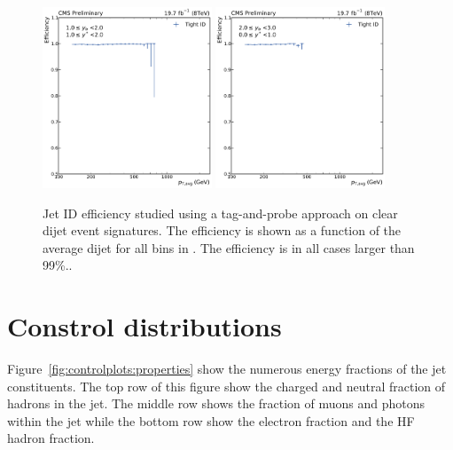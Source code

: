 \begin{figure}[htbp]
    \includegraphics[width=0.45\textwidth]{figures/measurement/jetideff_yb1ys1.pdf}\hfill
    \includegraphics[width=0.45\textwidth]{figures/measurement/jetideff_yb2ys0.pdf}
    \caption[Efficiency of the jet ID]{Jet ID efficiency studied using a
    tag-and-probe approach on clear dijet event signatures. The efficiency is
    shown as a function of the average dijet \pt for all bins in \ystar \yboost. The
    efficiency is in all cases larger than 99\%..}
    \label{fig:jetid_eff}
\end{figure}

\section{Constrol distributions}

Figure~\ref{fig:controlplots:properties} show the numerous energy fractions of the jet constituents. The top
row of this figure show the charged and neutral fraction of hadrons in the jet. The middle row shows
the fraction of muons and photons within the jet while the bottom row show the electron fraction and
the HF hadron fraction.

